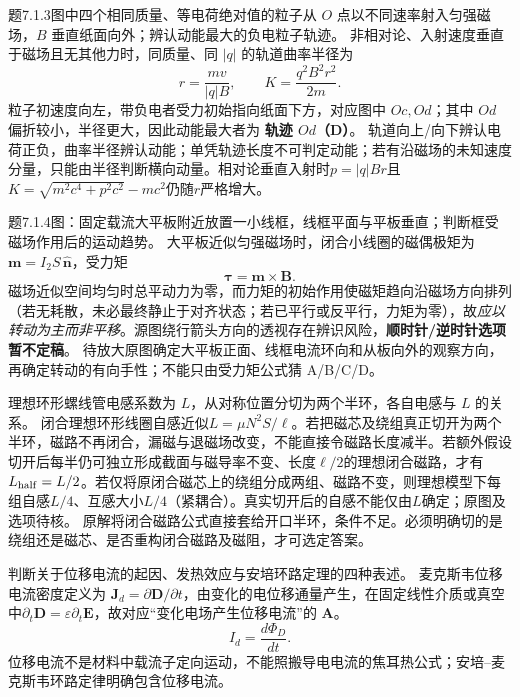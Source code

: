 \problemtext 题7.1.3图中四个相同质量、等电荷绝对值的粒子从 $O$ 点以不同速率射入匀强磁场，$B$ 垂直纸面向外；辨认动能最大的负电粒子轨迹。
\workings 非相对论、入射速度垂直于磁场且无其他力时，同质量、同 $|q|$ 的轨道曲率半径为
\[r=\frac{mv}{|q|B},\qquad K=\frac{q^2 B^2r^2}{2m}.\]
粒子初速度向左，带负电者受力初始指向纸面下方，对应图中 $Oc,Od$；其中 $Od$ 偏折较小，半径更大，因此动能最大者为 \textbf{轨迹 $Od$（D）}。
\crosscheck 轨道向上/向下辨认电荷正负，曲率半径辨认动能；单凭轨迹长度不可判定动能；若有沿磁场的未知速度分量，只能由半径判断横向动量。相对论垂直入射时$p=|q|Br$且$K=\sqrt{m^2c^4+p^2c^2}-mc^2$仍随$r$严格增大。

\problemtext 题7.1.4图：固定载流大平板附近放置一小线框，线框平面与平板垂直；判断框受磁场作用后的运动趋势。
\workings 大平板近似匀强磁场时，闭合小线圈的磁偶极矩为 $\bm m=I_2S\,\hat{\bm n}$，受力矩
\[\boxed{\bm \tau=\bm m\times\bm B}.\]
磁场近似空间均匀时总平动力为零，而力矩的初始作用使磁矩趋向沿磁场方向排列（若无耗散，未必最终静止于对齐状态；若已平行或反平行，力矩为零），故\emph{应以转动为主而非平移}。源图绕行箭头方向的透视存在辨识风险，\textbf{顺时针/逆时针选项暂不定稿}。
\crosscheck 待放大原图确定大平板正面、线框电流环向和从板向外的观察方向，再确定转动的有向手性；不能只由受力矩公式猜 A/B/C/D。

\problemtext 理想环形螺线管电感系数为 $L$，从对称位置分切为两个半环，各自电感与 $L$ 的关系。
\workings 闭合理想环形线圈自感近似$L=\mu N^2S/\ell$。若把磁芯及绕组真正切开为两个半环，磁路不再闭合，漏磁与退磁场改变，不能直接令磁路长度减半。若额外假设切开后每半仍可独立形成截面与磁导率不变、长度$\ell/2$的理想闭合磁路，才有$L_{\rm half}=L/2$。若仅将原闭合磁芯上的绕组分成两组、磁路不变，则理想模型下每组自感$L/4$、互感大小$L/4$（紧耦合）。真实切开后的自感不能仅由$L$确定；原图及选项待核。
\crosscheck 原解将闭合磁路公式直接套给开口半环，条件不足。必须明确切的是绕组还是磁芯、是否重构闭合磁路及磁阻，才可选定答案。

\problemtext 判断关于位移电流的起因、发热效应与安培环路定理的四种表述。
\workings 麦克斯韦位移电流密度定义为 $\bm J_d=\partial\bm D/\partial t$，由变化的电位移通量产生，在固定线性介质或真空中$\partial_t\bm D=\varepsilon\partial_t\bm E$，故对应“变化电场产生位移电流”的 \textbf{A}。
\[\boxed{I_d=\frac{d\Phi_D}{dt}}.\]
\crosscheck 位移电流不是材料中载流子定向运动，不能照搬导电电流的焦耳热公式；安培--麦克斯韦环路定律明确包含位移电流。

